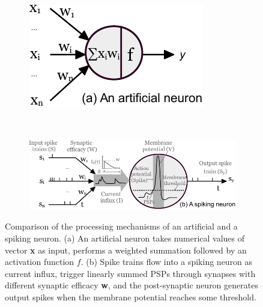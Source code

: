 \documentclass{article}
\begin{document}
	\begin{figure}[tb!]
		\centering
		\begin{subfigure}[t]{0.30\textwidth}
			\includegraphics[width=\textwidth]{pics_iconip/neuron_ann.pdf}
		\end{subfigure}~
		\begin{subfigure}[t]{0.65\textwidth}
			\includegraphics[width=\textwidth]{pics_iconip/neuron_snn.pdf}
		\end{subfigure}
		\caption{Comparison of the processing mechanisms of an artificial and a spiking neuron. (a) An artificial neuron takes numerical values of vector \textbf{x} as input, performs a weighted summation followed by an activation function $f$. (b) Spike trains flow into a spiking neuron as current influx, trigger linearly summed PSPs through synapses with different synaptic efficacy \textbf{w}, and the post-synaptic neuron generates output spikes when the membrane potential reaches some threshold.}
		\label{Fig:compare_as}
	\end{figure}
	
\end{document}
